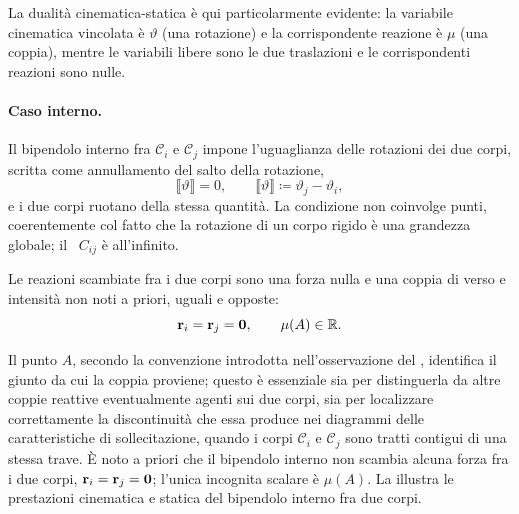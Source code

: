 \begin{oss}
	La dualità cinematica-statica è qui particolarmente
	evidente: la variabile cinematica vincolata è $\vartheta$
	(una rotazione) e la corrispondente reazione è $\mu$
	(una coppia), mentre le variabili libere sono le due
	traslazioni e le corrispondenti reazioni sono nulle.
\end{oss}



\paragraph{Caso interno.}
Il bipendolo interno fra $\mathcal{C}_i$ e $\mathcal{C}_j$
impone l'uguaglianza delle rotazioni dei due corpi,
scritta come annullamento del salto della rotazione,
\begin{equation}\label{eq:bipendolo_int}
	\llbracket \vartheta \rrbracket = 0,
	\qquad
	\llbracket \vartheta \rrbracket \coloneqq
	\vartheta_j - \vartheta_i,
\end{equation}
e i due corpi ruotano della stessa quantità. La condizione
non coinvolge punti, coerentemente col fatto che la
rotazione di un corpo rigido è una grandezza globale; il
\CRr\ $C_{ij}$ è all'infinito.

Le reazioni scambiate fra i due corpi sono una forza nulla
e una coppia di verso e intensità non noti a priori, uguali
e opposte:
\begin{equation}\label{eq:reazione_bipendolo_int}
	\mathbf{r}_i = \mathbf{r}_j = \mathbf{0},
	\qquad
	\mu(A) \in \mathbb{R}.
\end{equation}




Il punto $A$, secondo la convenzione introdotta
nell'osservazione del , identifica
il giunto da cui la coppia proviene; questo è essenziale
sia per distinguerla da altre coppie reattive eventualmente
agenti sui due corpi, sia per localizzare correttamente
la discontinuità che essa produce nei diagrammi delle
caratteristiche di sollecitazione, quando i corpi
$\mathcal{C}_i$ e $\mathcal{C}_j$ sono tratti contigui di
una stessa trave. È noto a priori che il bipendolo interno
non scambia alcuna forza fra i due corpi,
$\mathbf{r}_i = \mathbf{r}_j = \mathbf{0}$; l'unica incognita scalare è
$\mu(A)$. La  illustra
le prestazioni cinematica e statica del bipendolo interno
fra due corpi.



